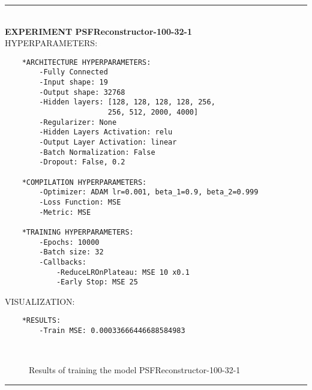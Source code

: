 \rule{0.5\textwidth}{0.5pt}\\

	{\large \textbf{EXPERIMENT PSFReconstructor-100-32-1}}\\
	
	{\normalsize HYPERPARAMETERS:}
	\begin{lstlisting}
	*ARCHITECTURE HYPERPARAMETERS:
		-Fully Connected
		-Input shape: 19
		-Output shape: 32768
		-Hidden layers: [128, 128, 128, 128, 256,
						256, 512, 2000, 4000]
		-Regularizer: None
		-Hidden Layers Activation: relu
		-Output Layer Activation: linear
		-Batch Normalization: False
		-Dropout: False, 0.2
	
	*COMPILATION HYPERPARAMETERS:
		-Optimizer: ADAM lr=0.001, beta_1=0.9, beta_2=0.999
		-Loss Function: MSE
		-Metric: MSE
	
	*TRAINING HYPERPARAMETERS:
		-Epochs: 10000
		-Batch size: 32
		-Callbacks: 
			-ReduceLROnPlateau: MSE 10 x0.1
			-Early Stop: MSE 25
	\end{lstlisting}
	
	{\normalsize VISUALIZATION:}
	\begin{lstlisting}
	*RESULTS:
        -Train MSE: 0.00033666446688584983
	\end{lstlisting}
	
	\begin{figure*}[ht!]
		\hspace{\fill}
		\hspace{\fill}	
		\\
		\caption{Results of training the model PSFReconstructor-100-32-1}
	\end{figure*}
	
\FloatBarrier	
\rule{0.5\textwidth}{0.5pt}\\